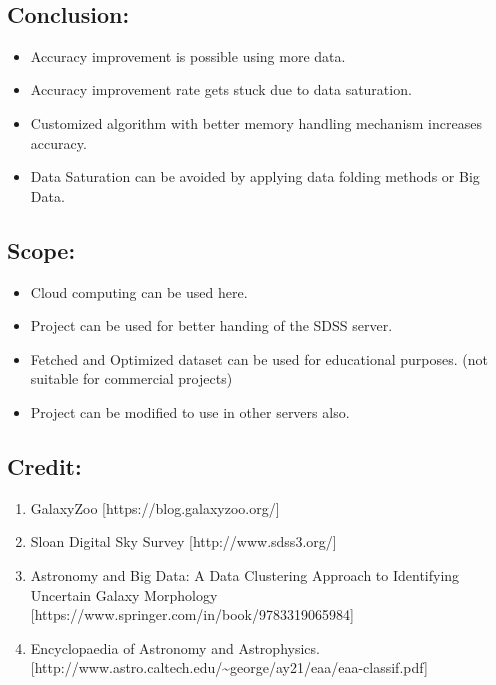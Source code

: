 \documentclass[11pt]{article}
\providecommand{\tightlist}{%
      \setlength{\itemsep}{0pt}\setlength{\parskip}{0pt}}
\begin{document}
    \begin{center}
    \end{center}
    { \hspace*{\fill} \\}
    
    \subsection{Conclusion:}\label{conclusion}

\begin{itemize}
\tightlist
\item
  Accuracy improvement is possible using more data.
\item
  Accuracy improvement rate gets stuck due to data saturation.
\item
  Customized algorithm with better memory handling mechanism increases
  accuracy.
\item
  Data Saturation can be avoided by applying data folding methods or Big
  Data.
\end{itemize}

    \subsection{Scope:}\label{scope}

\begin{itemize}
\tightlist
\item
  Cloud computing can be used here.
\item
  Project can be used for better handing of the SDSS server.
\item
  Fetched and Optimized dataset can be used for educational purposes.
  (not suitable for commercial projects)
\item
  Project can be modified to use in other servers also.
\end{itemize}

    \subsection{Credit:}\label{credit}

\begin{enumerate}
\def\labelenumi{\arabic{enumi}.}
\tightlist
\item
  GalaxyZoo {[}https://blog.galaxyzoo.org/{]}
\item
  Sloan Digital Sky Survey {[}http://www.sdss3.org/{]}
\item
  Astronomy and Big Data: A Data Clustering Approach to Identifying
  Uncertain Galaxy Morphology
  {[}https://www.springer.com/in/book/9783319065984{]}
\item
  Encyclopaedia of Astronomy and Astrophysics.
  {[}http://www.astro.caltech.edu/\textasciitilde{}george/ay21/eaa/eaa-classif.pdf{]}
\end{enumerate}


    
    
    
    
\end{document}
